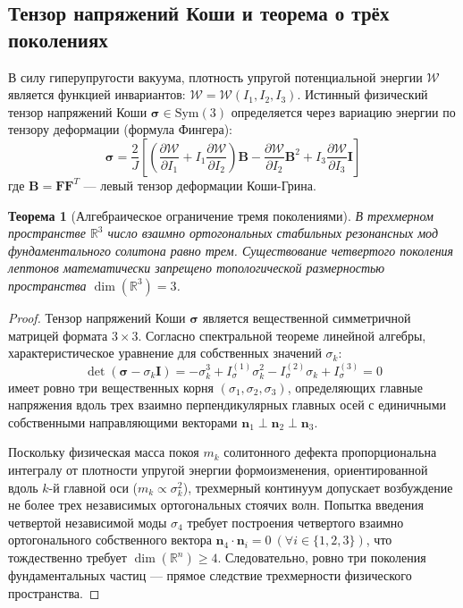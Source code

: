 \documentclass[12pt,a4paper]{article}
\newtheorem{theorem}{Теорема}
\begin{document}
	\subsection{Тензор напряжений Коши и теорема о трёх поколениях}
	В силу гиперупругости вакуума, плотность упругой потенциальной энергии $\mathcal{W}$ является функцией инвариантов: $\mathcal{W} = \mathcal{W}(I_1, I_2, I_3)$. Истинный физический тензор напряжений Коши $\boldsymbol{\sigma} \in \mathrm{Sym}(3)$ определяется через вариацию энергии по тензору деформации (формула Фингера):
	\begin{equation}
		\boldsymbol{\sigma} = \frac{2}{J} \left[ \left( \frac{\partial \mathcal{W}}{\partial I_1} + I_1 \frac{\partial \mathcal{W}}{\partial I_2} \right) \mathbf{B} - \frac{\partial \mathcal{W}}{\partial I_2} \mathbf{B}^2 + I_3 \frac{\partial \mathcal{W}}{\partial I_3} \mathbf{I} \right]
	\end{equation}
	где $\mathbf{B} = \mathbf{F} \mathbf{F}^T$ — левый тензор деформации Коши-Грина.
	
	\begin{theorem}[Алгебраическое ограничение тремя поколениями]
		В трехмерном пространстве $\mathbb{R}^3$ число взаимно ортогональных стабильных резонансных мод фундаментального солитона равно трем. Существование четвертого поколения лептонов математически запрещено топологической размерностью пространства $\dim(\mathbb{R}^3) = 3$.
	\end{theorem}
	
	\begin{proof}
		Тензор напряжений Коши $\boldsymbol{\sigma}$ является вещественной симметричной матрицей формата $3 \times 3$. Согласно спектральной теореме линейной алгебры, характеристическое уравнение для собственных значений $\sigma_k$:
		\begin{equation}
			\det(\boldsymbol{\sigma} - \sigma_k \mathbf{I}) = -\sigma_k^3 + I_\sigma^{(1)} \sigma_k^2 - I_\sigma^{(2)} \sigma_k + I_\sigma^{(3)} = 0
		\end{equation}
		имеет ровно три вещественных корня $(\sigma_1, \sigma_2, \sigma_3)$, определяющих главные напряжения вдоль трех взаимно перпендикулярных главных осей с единичными собственными направляющими векторами $\mathbf{n}_1 \perp \mathbf{n}_2 \perp \mathbf{n}_3$.
		
		Поскольку физическая масса покоя $m_k$ солитонного дефекта пропорциональна интегралу от плотности упругой энергии формоизменения, ориентированной вдоль $k$-й главной оси ($m_k \propto \sigma_k^2$), трехмерный континуум допускает возбуждение не более трех независимых ортогональных стоячих волн. Попытка введения четвертой независимой моды $\sigma_4$ требует построения четвертого взаимно ортогонального собственного вектора $\mathbf{n}_4 \cdot \mathbf{n}_i = 0 \ (\forall i \in \{1,2,3\})$, что тождественно требует $\dim(\mathbb{R}^n) \ge 4$. Следовательно, ровно три поколения фундаментальных частиц — прямое следствие трехмерности физического пространства.
	\end{proof}
\end{document}
